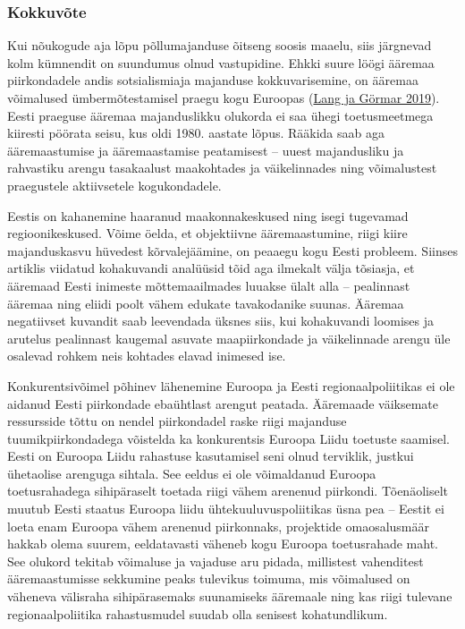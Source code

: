 \documentclass[estonian,]{article}
\begin{document}
\hypertarget{kokkuvuxf5te-1}{%
\subsubsection*{Kokkuvõte}\label{kokkuvuxf5te-1}}

Kui nõukogude aja lõpu põllumajanduse õitseng soosis maaelu, siis järgnevad kolm kümnendit on suundumus olnud vastupidine. Ehkki suure löögi ääremaa piirkondadele andis sotsialismiaja majanduse kokkuvarisemine, on ääremaa võimalused ümbermõtestamisel praegu kogu Euroopas (\protect\hyperlink{Lang2019}{Lang ja Görmar 2019}). Eesti praeguse ääremaa majanduslikku olukorda ei saa ühegi toetusmeetmega kiiresti pöörata seisu, kus oldi 1980. aastate lõpus. Rääkida saab aga ääremaastumise ja ääremaastamise peatamisest -- uuest majandusliku ja rahvastiku arengu tasakaalust maakohtades ja väikelinnades ning võimalustest praegustele aktiivsetele kogukondadele.

Eestis on kahanemine haaranud maakonnakeskused ning isegi tugevamad regioonikeskused. Võime öelda, et objektiivne ääremaastumine, riigi kiire majanduskasvu hüvedest kõrvalejäämine, on peaaegu kogu Eesti probleem. Siinses artiklis viidatud kohakuvandi analüüsid tõid aga ilmekalt välja tõsiasja, et ääremaad Eesti inimeste mõttemaailmades luuakse ülalt alla -- pealinnast ääremaa ning eliidi poolt vähem edukate tavakodanike suunas. Ääremaa negatiivset kuvandit saab leevendada üksnes siis, kui kohakuvandi loomises ja arutelus pealinnast kaugemal asuvate maapiirkondade ja väikelinnade arengu üle osalevad rohkem neis kohtades elavad inimesed ise.

Konkurentsivõimel põhinev lähenemine Euroopa ja Eesti regionaalpoliitikas ei ole aidanud Eesti piirkondade ebaühtlast arengut peatada. Ääremaade väiksemate ressursside tõttu on nendel piirkondadel raske riigi majanduse tuumikpiirkondadega võistelda ka konkurentsis Euroopa Liidu toetuste saamisel. Eesti on Euroopa Liidu rahastuse kasutamisel seni olnud terviklik, justkui ühetaolise arenguga sihtala. See eeldus ei ole võimaldanud Euroopa toetusrahadega sihipäraselt toetada riigi vähem arenenud piirkondi. Tõenäoliselt muutub Eesti staatus Euroopa liidu ühtekuuluvuspoliitikas üsna pea -- Eestit ei loeta enam Euroopa vähem arenenud piirkonnaks, projektide omaosalusmäär hakkab olema suurem, eeldatavasti väheneb kogu Euroopa toetusrahade maht. See olukord tekitab võimaluse ja vajaduse aru pidada, millistest vahenditest ääremaastumisse sekkumine peaks tulevikus toimuma, mis võimalused on väheneva välisraha sihipärasemaks suunamiseks ääremaale ning kas riigi tulevane regionaalpoliitika rahastusmudel suudab olla senisest kohatundlikum.
\end{document}
